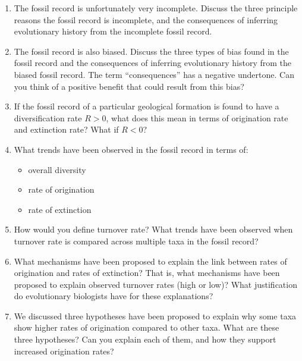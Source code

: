 \documentclass[letterpaper]{tufte-handout}
\begin{document}
\begin{enumerate}
	\item The fossil record is unfortunately very incomplete.  Discuss the three principle reasons the fossil record is incomplete, and the consequences of inferring evolutionary history from the incomplete fossil record.

	\item The fossil record is also biased.  Discuss the three types of bias found in the fossil record and the consequences of inferring evolutionary history from the biased fossil record.  The term ``consequences'' has a negative undertone.  Can you think of a positive benefit that could result from this bias?

	\item If the fossil record of a particular geological formation is found to have a diversification rate $R > 0$, what does this mean in terms of origination rate and extinction rate?  What if $R < 0$?

	\item What trends have been observed in the fossil record in terms of:
	\begin{itemize}
		\item overall diversity
		\item rate of origination
		\item rate of extinction
	\end{itemize}
	
	\item How would you define turnover rate?  What trends have been observed when turnover rate is compared across multiple taxa in the fossil record?

	\item What mechanisms have been proposed to explain the link between rates of origination and rates of extinction?  That is, what mechanisms have been proposed to explain observed turnover rates (high or low)?  What justification do evolutionary biologists have for these explanations?  

	\item We discussed three hypotheses have been proposed to explain why some taxa show higher rates of origination compared to other taxa.  What are these three hypotheses?  Can you explain each of them, and how they support increased origination rates?

\end{enumerate}
\end{document}
